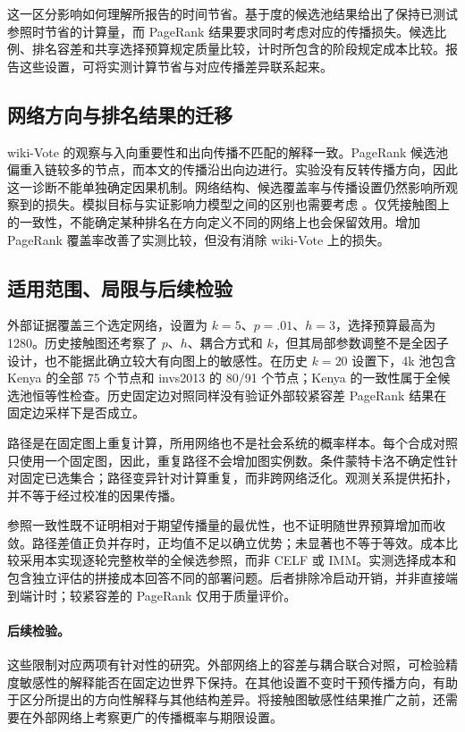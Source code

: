 \documentclass[smallextended]{svjour3}
\begin{document}
这一区分影响如何理解所报告的时间节省。基于度的候选池结果给出了保持已测试参照时节省的计算量，而 PageRank 结果要求同时考虑对应的传播损失。候选比例、排名容差和共享选择预算规定质量比较，计时所包含的阶段规定成本比较。报告这些设置，可将实测计算节省与对应传播差异联系起来。

\subsection{网络方向与排名结果的迁移}
wiki-Vote 的观察与入向重要性和出向传播不匹配的解释一致。PageRank 候选池偏重入链较多的节点，而本文的传播沿出向边进行。实验没有反转传播方向，因此这一诊断不能单独确定因果机制。网络结构、候选覆盖率与传播设置仍然影响所观察到的损失。模拟目标与实证影响力模型之间的区别也需要考虑 \cite{ref15}。仅凭接触图上的一致性，不能确定某种排名在方向定义不同的网络上也会保留效用。增加 PageRank 覆盖率改善了实测比较，但没有消除 wiki-Vote 上的损失。

\subsection{适用范围、局限与后续检验}
外部证据覆盖三个选定网络，设置为 $k=5$、$p=.01$、$h=3$，选择预算最高为 1280。历史接触图还考察了 $p$、$h$、耦合方式和 $k$，但其局部参数调整不是全因子设计，也不能据此确立较大有向图上的敏感性。在历史 $k=20$ 设置下，4k 池包含 Kenya 的全部 75 个节点和 invs2013 的 80/91 个节点；Kenya 的一致性属于全候选池恒等性检查。历史固定边对照同样没有验证外部较紧容差 PageRank 结果在固定边采样下是否成立。

路径是在固定图上重复计算，所用网络也不是社会系统的概率样本。每个合成对照只使用一个固定图，因此，重复路径不会增加图实例数。条件蒙特卡洛不确定性针对固定已选集合；路径变异针对计算重复，而非跨网络泛化。观测关系提供拓扑，并不等于经过校准的因果传播。

参照一致性既不证明相对于期望传播量的最优性，也不证明随世界预算增加而收敛。路径差值正负并存时，正均值不足以确立优势；未显著也不等于等效。成本比较采用本实现逐轮完整枚举的全候选参照，而非 CELF 或 IMM。实测选择成本和包含独立评估的拼接成本回答不同的部署问题。后者排除冷启动开销，并非直接端到端计时；较紧容差的 PageRank 仅用于质量评价。

\paragraph{后续检验。}这些限制对应两项有针对性的研究。外部网络上的容差与耦合联合对照，可检验精度敏感性的解释能否在固定边世界下保持。在其他设置不变时干预传播方向，有助于区分所提出的方向性解释与其他结构差异。将接触图敏感性结果推广之前，还需要在外部网络上考察更广的传播概率与期限设置。
\end{document}
